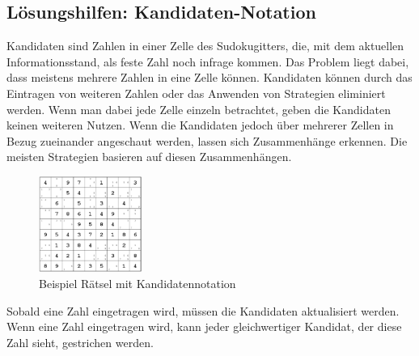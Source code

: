 \subsection{Lösungshilfen: Kandidaten-Notation}
Kandidaten sind Zahlen in einer Zelle des Sudokugitters, die, mit dem aktuellen Informationsstand, als feste Zahl noch infrage kommen. Das Problem liegt dabei, dass meistens mehrere Zahlen in eine Zelle können. Kandidaten können durch das Eintragen von weiteren Zahlen oder das Anwenden von Strategien eliminiert werden. Wenn man dabei jede Zelle einzeln betrachtet, geben die Kandidaten keinen weiteren Nutzen. Wenn die Kandidaten jedoch über mehrerer Zellen in Bezug zueinander angeschaut werden, lassen sich Zusammenhänge erkennen. Die meisten Strategien basieren auf diesen Zusammenhängen. 

\begin{figure}[htbp]
	\centering
	\includegraphics[width=0.3\textwidth]{images/BeispielKandidatennotation.png}
	\caption{Beispiel Rätsel mit Kandidatennotation}
	\label{fig:SudokugitterKandidaten}
\end{figure}

Sobald eine Zahl eingetragen wird, müssen die Kandidaten aktualisiert werden. Wenn eine Zahl eingetragen wird, kann jeder gleichwertiger Kandidat, der diese Zahl sieht, gestrichen werden. \cite[85\psq]{althofer2014spiele} \cite{martin} \cite[4]{zambon2015sudoku}

